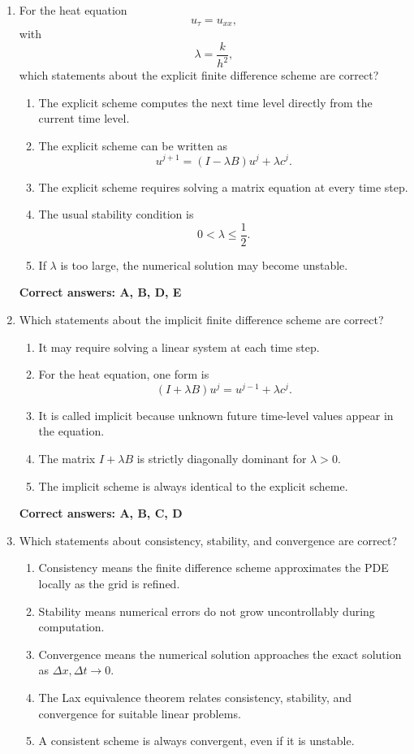 \documentclass[a4paper,12pt]{article}
\begin{document}
\begin{enumerate}
\begin{enumerate}[label=(\arabic*)]
\textbf{Correct answers: A, B, C, E}
\item For the heat equation
\[
u_\tau=u_{xx},
\]
with
\[
\lambda=\frac{k}{h^2},
\]
which statements about the explicit finite difference scheme are correct?

\begin{enumerate}[label=\Alph*.]
    \item The explicit scheme computes the next time level directly from the current time level.
    \item The explicit scheme can be written as
    \[
    u^{j+1}=(I-\lambda B)u^j+\lambda c^j.
    \]
    \item The explicit scheme requires solving a matrix equation at every time step.
    \item The usual stability condition is
    \[
    0<\lambda\leq \frac12.
    \]
    \item If \(\lambda\) is too large, the numerical solution may become unstable.
\end{enumerate}

\textbf{Correct answers: A, B, D, E}
\item Which statements about the implicit finite difference scheme are correct?

\begin{enumerate}[label=\Alph*.]
    \item It may require solving a linear system at each time step.
    \item For the heat equation, one form is
    \[
    (I+\lambda B)u^j=u^{j-1}+\lambda c^j.
    \]
    \item It is called implicit because unknown future time-level values appear in the equation.
    \item The matrix \(I+\lambda B\) is strictly diagonally dominant for \(\lambda>0\).
    \item The implicit scheme is always identical to the explicit scheme.
\end{enumerate}

\textbf{Correct answers: A, B, C, D}
\item Which statements about consistency, stability, and convergence are correct?

\begin{enumerate}[label=\Alph*.]
    \item Consistency means the finite difference scheme approximates the PDE locally as the grid is refined.
    \item Stability means numerical errors do not grow uncontrollably during computation.
    \item Convergence means the numerical solution approaches the exact solution as \(\Delta x,\Delta t\to0\).
    \item The Lax equivalence theorem relates consistency, stability, and convergence for suitable linear problems.
    \item A consistent scheme is always convergent, even if it is unstable.
\end{enumerate}


\end{enumerate}
\end{enumerate}
\end{document}
